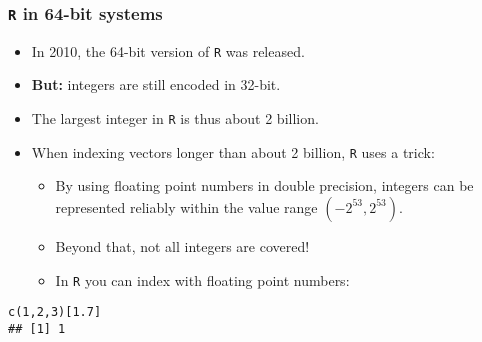 \documentclass[11pt,compress,t,notes=noshow, xcolor=table]{beamer}
\begin{document}
\begin{vbframe}
\frametitle{\texttt{R} in 64-bit systems}
\begin{itemize}
  \item In 2010, the 64-bit version of \texttt{R} was released.
  \item \textbf{But:} integers are still encoded in 32-bit.
  \item The largest integer in \texttt{R} is thus about 2 billion.
  \item When indexing vectors longer than about 2 billion, \texttt{R} uses a trick:
  \begin{itemize}
    \item By using floating point numbers in double precision, integers can be represented reliably within the value range $(-2^{53}, 2^{53})$.
    \item Beyond that, not all integers are covered!
    \item In \texttt{R} you can index with floating point numbers:
  \end{itemize}
\end{itemize}

\footnotesize
\lz
\begin{verbatim}
c(1,2,3)[1.7]
## [1] 1
\end{verbatim}

\end{vbframe}

\endlecture
\end{document}

